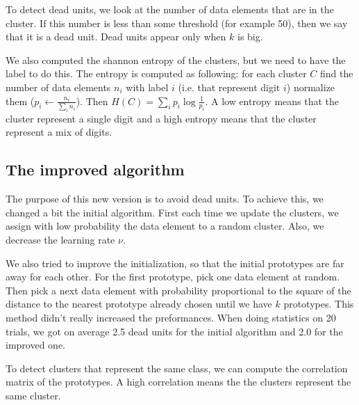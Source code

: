 \documentclass[12pt,a4paper]{article}
\begin{document}
To detect dead units, we look at the number of data elements that are in the cluster. If this number is less than some threshold (for example 50), then we say that it is a dead unit.
Dead units appear only when $k$ is big. 

We also computed the shannon entropy of the clusters, but we need to have the label to do this.  The entropy is computed as following: 
for each cluster $C$ find the number of data elements $n_i$  with label $i$ (i.e. that represent digit $i$) normalize them ($p_i \leftarrow \frac{n_i}{\sum_i{n_i}}$). 
Then $H(C) = \sum_i{p_i \log\frac{1}{p_i}}$. A low entropy means that the cluster represent 
a single digit and a high entropy means that the cluster represent a mix of digits.
\subsection*{The improved algorithm}
The purpose of this new version is to avoid dead units. To achieve this, we changed a bit the initial algorithm.
First each time we update the clusters, we assign with low probability the data element to a random cluster. Also, we decrease the learning rate $\nu$. 

We also tried to improve the initialization, so that the initial prototypes are far away for each other. For the first prototype, pick one data element at random. Then pick a next 
data element with probability proportional to the square of the distance to the nearest prototype already chosen until we have $k$ prototypes. This method didn't really increased the
preformances. When doing statistics on 20 trials, we got on average 2.5 dead units for the initial algorithm and 2.0 for the improved one. 

To detect clusters that represent the same class, we can compute the correlation matrix of the prototypes. A high correlation means the the clusters represent the same cluster.
\end{document}
